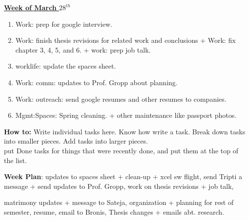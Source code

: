 \documentclass[11pt]{article}
\begin{document}
{\small \underline{\textbf{Week of March $28^{th}$}}}\\  
\begin{enumerate} 
\small \item \small Work: prep for google interview. 
\small \item \small Work: finish thesis revisions for related work and
conclusions + Work: fix chapter 3, 4, 5, and 6. + work: prep job
talk. 
\item \small worklife: update the spaces sheet. 
\small \item \small Work: comm: updates to Prof. Gropp about planning.  
\small \item \small Work: outreach:  send google resumes and other resumes to
companies. 
\item \small Mgmt:Spaces: Spring cleaning. + other maintenance like
  passport photos.  
\end{enumerate} 

\newpage 
\textbf{How to:} Write individual tasks here. Know how write a task. 
Break down tasks into smaller pieces. Add tasks into larger
pieces. \\ put Done tasks for things that were recently done, and put
them at the top of the list.


\textbf{Week Plan}: updates to spaces sheet + clean-up +  xcel sw
flight, send Tripti a message + send updates to Prof. Gropp, work on
thesis revisions + job talk, 

 matrimony updates + message to Sateja,
organization + planning for rest of semester, resume, email to Bronis,
Thesis changes + emails abt. research. 


\end{document}
